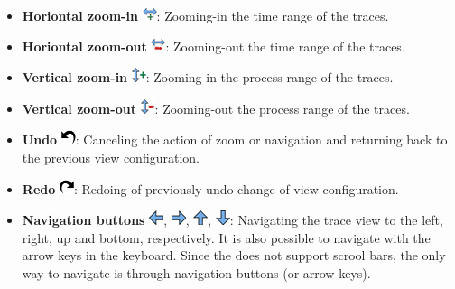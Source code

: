 \begin{itemize}
\item \textbf{Horiontal zoom-in} \includegraphics{fig/hpctraceviewer-button-zoom-in-time.png}: Zooming-in the time range of the traces.
\item \textbf{Horiontal zoom-out} \includegraphics{fig/hpctraceviewer-button-zoom-out-time.png}: Zooming-out the time range of the traces.
\item \textbf{Vertical zoom-in} \includegraphics[scale=.5]{fig/hpctraceviewer-button-zoom-in-process.png}: Zooming-in the process range of the traces.
\item \textbf{Vertical zoom-out} \includegraphics[scale=.5]{fig/hpctraceviewer-button-zoom-out-process.png}: Zooming-out the process range of the traces.
\item \textbf{Undo} \includegraphics[scale=.5]{fig/hpctraceviewer-button-undo.png}: Canceling the action of zoom or navigation and returning back to the previous view configuration.
\item \textbf{Redo} \includegraphics[scale=.5]{fig/hpctraceviewer-button-redo.png}: Redoing of previously undo change of view configuration.
\item \textbf{Navigation buttons} \includegraphics[scale=.5]{fig/hpctraceviewer-button-go-east.png}, \includegraphics[scale=.5]{fig/hpctraceviewer-button-go-west.png}, \includegraphics[scale=.5]{fig/hpctraceviewer-button-go-north.png}, \includegraphics[scale=.5]{fig/hpctraceviewer-button-go-south.png}: Navigating the trace view to the left, right, up and bottom, respectively. It is also possible to navigate with the arrow keys in the keyboard. Since the \traceview{} does not support scrool bars, the only way to navigate is through navigation buttons (or arrow keys).


\end{itemize}

